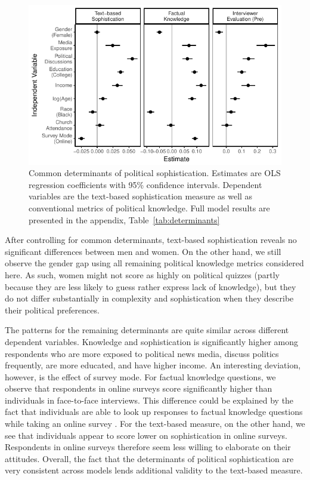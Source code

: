 \documentclass[12pt]{article}
\begin{document}
\begin{figure}[h]\centering
\includegraphics{../fig/determinants_pres.pdf}
\caption{Common determinants of political sophistication. Estimates are OLS regression coefficients with 95\% confidence intervals. Dependent variables are the text-based sophistication measure as well as conventional metrics of political knowledge. Full model results are presented in the appendix, Table~\ref{tab:determinants}}\label{fig:determinants}
\end{figure}

After controlling for common determinants, text-based sophistication reveals no significant differences between men and women. On the other hand, we still observe the gender gap using all remaining political knowledge metrics considered here. As such, women might not score as highly on political quizzes (partly because they are less likely to guess rather express lack of knowledge), but they do not differ substantially in complexity and sophistication when they describe their political preferences.

The patterns for the remaining determinants are quite similar across different dependent variables. Knowledge and sophistication is significantly higher among respondents who are more exposed to political news media, discuss politics frequently, are more educated, and have higher income. An interesting deviation, however, is the effect of survey mode. For factual knowledge questions, we observe that respondents in online surveys score significantly higher than individuals in face-to-face interviews. This difference could be explained by the fact that individuals are able to look up responses to factual knowledge questions while taking an online survey \citep[see also][]{clifford2016cheating}. For the text-based measure, on the other hand, we see that individuals appear to score lower on sophistication in online surveys. Respondents in online surveys therefore seem less willing to elaborate on their attitudes. Overall, the fact that the determinants of political sophistication are very consistent across models lends additional validity to the text-based measure.
\end{document}
